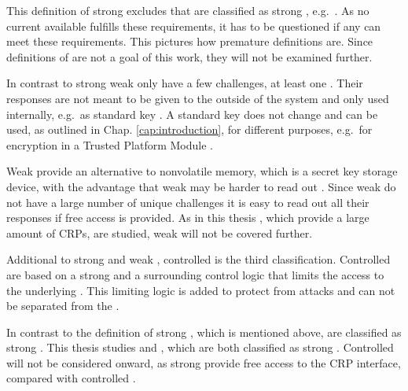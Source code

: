 This definition of strong \pufs excludes \pufs that are classified as strong \puf, e.g.\ \xpufs \cite{Becker2015ThePUFs}.
As no current available \puf fulfills these requirements, it has to be questioned if any \puf can meet these requirements.
This pictures how premature \puf definitions are.
Since definitions of \pufs are not a goal of this work, they will not be examined further.

In contrast to strong \pufs weak \pufs only have a few challenges, at least one \cite{Ruhrmair2014PUFsGlance}.
Their responses are not meant to be given to the outside of the system and only used internally, e.g.\ as standard key \cite{Ruhrmair2012AnPUFs}. %
A standard key does not change and can be used, as outlined in Chap. \ref{cap:introduction}, for different purposes, e.g.\ for encryption in a Trusted Platform Module \cite{TCG2011TPMPrinciples}. %

Weak \pufs provide an alternative to nonvolatile memory, which is a secret key storage device, with the advantage that weak \pufs may be harder to read out \cite{Lim2005ExtractingCircuits}.
Since weak \pufs do not have a large number of unique challenges it is easy to read out all their responses if free access is provided.
As in this thesis \pufs, which provide a large amount of \acp{CRP}, are studied, weak \pufs will not be covered further.

Additional to strong \puf and weak \puf, controlled \pufs is the third classification.
Controlled \pufs are based on a strong \pufs and a surrounding control logic that limits the access to the underlying \puf.
This limiting logic is added to protect \pufs from attacks and can not be separated from the \puf \cite{Ruhrmair2013PUFData,Gassend2007ControlledFunctions}. %

In contrast to the definition of strong \pufs, which is mentioned above, \apufs are classified as strong \puf \cite{Ruhrmair2010StrongProofs}.
This thesis studies \apufs and \xpufs, which are both classified as strong \puf.  
Controlled \pufs will not be considered onward, as strong \pufs provide free access to the \ac{CRP} interface, compared with controlled \pufs. %

